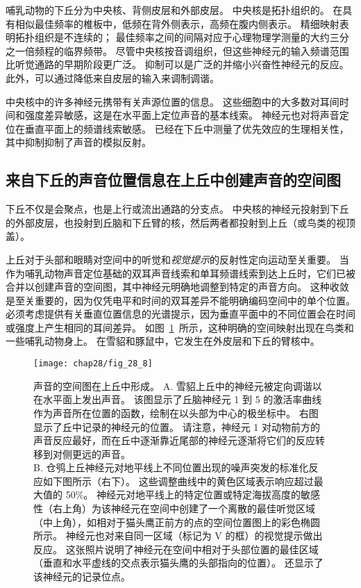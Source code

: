 哺乳动物的下丘分为中央核、背侧皮层和外部皮层。
中央核是拓扑组织的。 
在具有相似最佳频率的椎板中，低频在背外侧表示，高频在腹内侧表示。
精细映射表明拓扑组织是不连续的； 
最佳频率之间的间隔对应于心理物理学测量的大约三分之一倍频程的临界频带。
尽管中央核按音调组织，但这些神经元的输入频谱范围比听觉通路的早期阶段更广泛。
抑制可以是广泛的并缩小兴奋性神经元的反应。
此外，可以通过降低来自皮层的输入来调制调谐。


中央核中的许多神经元携带有关声源位置的信息。
这些细胞中的大多数对耳间时间和强度差异敏感，这是在水平面上定位声音的基本线索。
神经元也对将声音定位在垂直平面上的频谱线索敏感。
已经在下丘中测量了优先效应的生理相关性，其中抑制抑制了声音的模拟反射。




\subsection{来自下丘的声音位置信息在上丘中创建声音的空间图}

下丘不仅是会聚点，也是上行或流出通路的分支点。
中央核的神经元投射到下丘的外部皮层，也投射到丘脑和下丘臂的核，然后两者都投射到上丘（或鸟类的视顶盖）。


上丘对于头部和眼睛对空间中的听觉和\textit{视觉提示}的反射性定向运动至关重要。
当作为哺乳动物声音定位基础的双耳声音线索和单耳频谱线索到达上丘时，它们已被合并以创建声音的空间图，其中神经元明确地调整到特定的声音方向。
这种收敛是至关重要的，因为仅凭电平和时间的双耳差异不能明确编码空间中的单个位置。
必须考虑提供有关垂直位置信息的光谱提示，因为垂直平面中的不同位置会在时间或强度上产生相同的耳间差异。
如图~\ref{fig:28_8}~所示，这种明确的空间映射出现在鸟类和一些哺乳动物身上。
在雪貂和豚鼠中，它发生在外皮层和下丘的臂核中。


\begin{figure}[htbp]
	\centering
	\texttt{[image: chap28/fig\_28\_8]}
	\caption{声音的空间图在上丘中形成。 
		A. 雪貂上丘中的神经元被定向调谐以在水平面上发出声音。
		该图显示了丘脑神经元 1 到 5 的激活率曲线作为声音所在位置的函数，绘制在以头部为中心的极坐标中。
		右图显示了丘中记录的神经元的位置。 
		请注意，神经元 1 对动物前方的声音反应最好，而在丘中逐渐靠近尾部的神经元逐渐将它们的反应转移到对侧更远的声音\cite{king1999sensory}。\\
		B. 仓鸮上丘神经元对地平线上不同位置出现的噪声突发的标准化反应如下图所示（右下）。
		这些调整曲线中的黄色区域表示响应超过最大值的 50\%。
		神经元对地平线上的特定位置或特定海拔高度的敏感性（右上角）为该神经元在空间中创建了一个离散的最佳听觉区域（中上角），如相对于猫头鹰正前方的点的空间位置图上的彩色椭圆所示。
		神经元也对来自同一区域（标记为 V 的框）的视觉提示做出反应。
		这张照片说明了神经元在空间中相对于头部位置的最佳区域（垂直和水平虚线的交点表示猫头鹰的头部指向的位置）。
		还显示了该神经元的记录位点\cite{cohen1999maps}。}
	\label{fig:28_8}
\end{figure}


